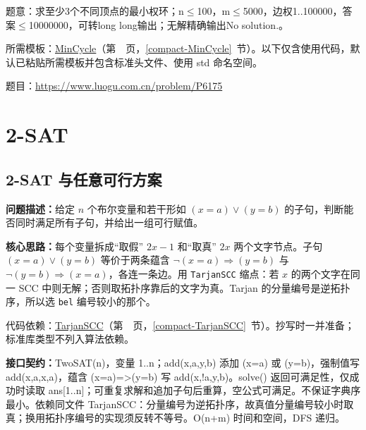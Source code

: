 \label{usage-example-374}

题意：求至少3个不同顶点的最小权环；n$\le$100，m$\le$5000，边权1..100000，答案$\le$10000000，可转long long输出；无解精确输出No solution.。

所需模板：\hyperref[compact-MinCycle]{MinCycle}（第~\pageref{compact-MinCycle}~页，\ref{compact-MinCycle}~节）。以下仅含使用代码，默认已粘贴所需模板并包含标准头文件、使用 std 命名空间。

题目：\url{https://www.luogu.com.cn/problem/P6175}



\Needspace{537pt}

\chapter{2-SAT}

\section{2-SAT 与任意可行方案}\label{compact-TwoSAT}

\noindent\textbf{问题描述：}\allowbreak 给定 $n$ 个布尔变量和若干形如 $(x=a)\lor(y=b)$ 的子句，判断能否同时满足所有子句，并给出一组可行赋值。

\textbf{核心思路：}\allowbreak 每个变量拆成“取假” $2x-1$ 和“取真” $2x$ 两个文字节点。子句 $(x=a)\lor(y=b)$ 等价于两条蕴含 $\lnot(x=a)\Rightarrow(y=b)$ 与 $\lnot(y=b)\Rightarrow(x=a)$，各连一条边。用 \texttt{TarjanSCC} 缩点：若 $x$ 的两个文字在同一 SCC 中则无解；否则取拓扑序靠后的文字为真。Tarjan 的分量编号是逆拓扑序，所以选 \texttt{bel} 编号较小的那个。

代码依赖：\hyperref[compact-TarjanSCC]{TarjanSCC}（第~\pageref{compact-TarjanSCC}~页，\ref{compact-TarjanSCC}~节）。抄写时一并准备；标准库类型不列入算法依赖。

{\sloppy{}\noindent\textbf{接口契约：}TwoSAT(n)，变量 1..n；add(x,a,y,b) 添加 (x=a) 或 (y=b)，强制值写 add(x,a,x,a)，蕴含 (x=a)=>(y=b) 写 add(x,!a,y,b)。solve() 返回可满足性，仅成功时读取 ans[1..n]；可重复求解和追加子句后重算，空公式可满足。不保证字典序最小。依赖同文件 TarjanSCC：分量编号为逆拓扑序，故真值分量编号较小时取真；换用拓扑序编号的实现须反转不等号。O(n+m) 时间和空间，DFS 递归。\par}



\Needspace{418pt}

